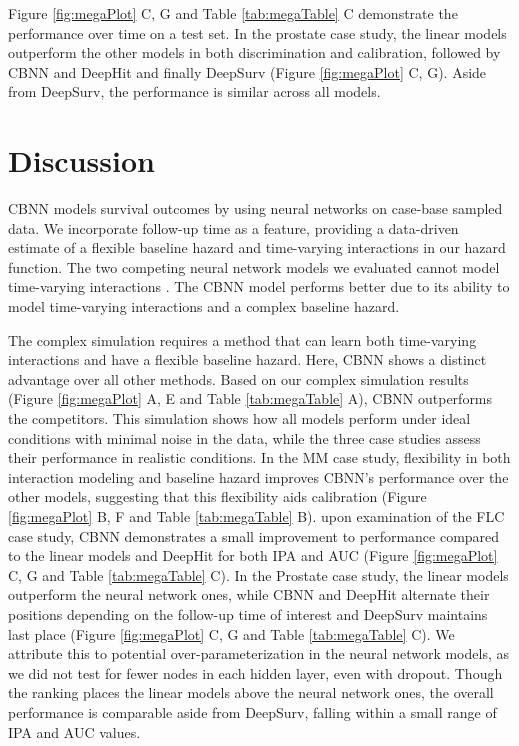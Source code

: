 \documentclass[APA,LATO1COL]{WileyNJD-v2}
\begin{document}
Figure \ref{fig:megaPlot} C, G and Table \ref{tab:megaTable} C demonstrate the performance over time on a test set. In the prostate case study, the linear models outperform the other
models in both discrimination and calibration, followed by CBNN and DeepHit and finally DeepSurv (Figure \ref{fig:megaPlot} C, G). Aside from DeepSurv, the performance is
similar across all models.





\hypertarget{discussion}{%
\section{Discussion}\label{discussion}}

CBNN models survival outcomes by using neural networks on case-base sampled data. We incorporate follow-up time as a feature, providing a data-driven
estimate of a flexible baseline hazard and time-varying interactions in our hazard function. The two competing neural network models we evaluated cannot
model time-varying interactions \citep{katzman2018DeepSurv} \citep{lee2018DeepHit}. The CBNN model performs better due to its ability to model time-varying
interactions and a complex baseline hazard.

The complex simulation requires a method that can learn both time-varying interactions and have a flexible baseline hazard. Here, CBNN shows a distinct
advantage over all other methods. Based on our complex simulation results (Figure \ref{fig:megaPlot} A, E and Table \ref{tab:megaTable} A), CBNN
outperforms the competitors. This simulation shows how all models perform under ideal conditions with minimal noise in the data, while the three
case studies assess their performance in realistic conditions. In the MM case study, flexibility in both interaction modeling and baseline hazard
improves CBNN's performance over the other models, suggesting that this flexibility aids calibration (Figure \ref{fig:megaPlot} B, F and Table
\ref{tab:megaTable} B). upon examination of the FLC case study, CBNN demonstrates a small improvement to performance compared to the linear
models and DeepHit for both IPA and AUC (Figure \ref{fig:megaPlot} C, G and Table \ref{tab:megaTable} C). In the Prostate case study, the linear
models outperform the neural network ones, while CBNN and DeepHit alternate their positions depending on the follow-up time of interest and DeepSurv
maintains last place (Figure \ref{fig:megaPlot} C, G and Table \ref{tab:megaTable} C). We attribute this to potential over-parameterization in the neural
network models, as we did not test for fewer nodes in each hidden layer, even with dropout. Though the ranking places the linear models above the
neural network ones, the overall performance is comparable aside from DeepSurv, falling within a small range of IPA and AUC values.
\end{document}
